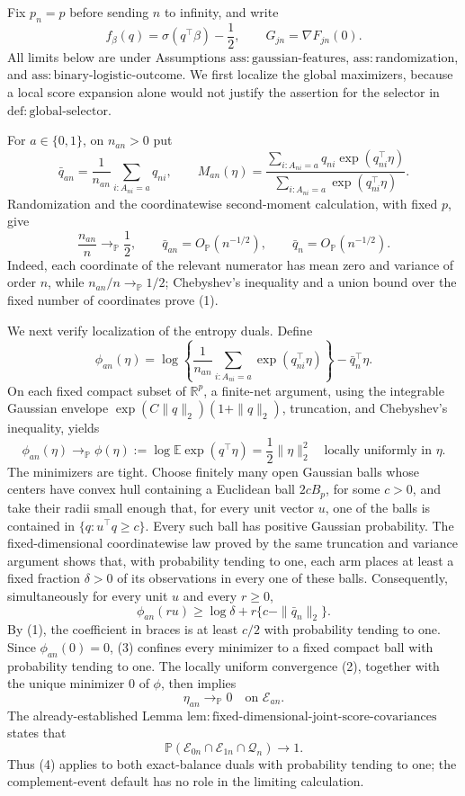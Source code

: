Fix \(p_n=p\) before sending \(n\) to infinity, and write
\[
 f_\beta(q)=\sigma(q^\top\beta)-\frac12,
 \qquad
 G_{jn}=\nabla F_{jn}(0).
\]
All limits below are under Assumptions
\(\mathrm{ass{:}gaussian\mbox{-}features}\),
\(\mathrm{ass{:}randomization}\), and
\(\mathrm{ass{:}binary\mbox{-}logistic\mbox{-}outcome}\).  We first
localize the global maximizers, because a local score expansion alone would
not justify the assertion for the selector in
\(\mathrm{def{:}global\mbox{-}selector}\).

For \(a\in\{0,1\}\), on \(n_{an}>0\) put
\[
 \bar q_{an}=\frac1{n_{an}}\sum_{i:A_{ni}=a}q_{ni},
 \qquad
 M_{an}(\eta)=
 \frac{\sum_{i:A_{ni}=a}q_{ni}\exp(q_{ni}^{\top}\eta)}
      {\sum_{i:A_{ni}=a}\exp(q_{ni}^{\top}\eta)} .
\]
Randomization and the coordinatewise second-moment calculation, with fixed
\(p\), give
\[
 \frac{n_{an}}n\longrightarrow_{\mathbb P}\frac12,
 \qquad
 \bar q_{an}=O_{\mathbb P}(n^{-1/2}),
 \qquad
 \bar q_n=O_{\mathbb P}(n^{-1/2}).
 \tag{1}
\]
Indeed, each coordinate of the relevant numerator has mean zero and variance
of order \(n\), while \(n_{an}/n\to_{\mathbb P}1/2\); Chebyshev's inequality
and a union bound over the fixed number of coordinates prove (1).

We next verify localization of the entropy duals.  Define
\[
 \phi_{an}(\eta)=
 \log\!\left\{\frac1{n_{an}}\sum_{i:A_{ni}=a}
        \exp(q_{ni}^{\top}\eta)\right\}-\bar q_n^\top\eta .
\]
On each fixed compact subset of \(\mathbb R^p\), a finite-net argument,
using the integrable Gaussian envelope
\(\exp(C\|q\|_2)(1+\|q\|_2)\), truncation, and Chebyshev's inequality,
yields
\[
 \phi_{an}(\eta)\longrightarrow_{\mathbb P}
 \phi(\eta):=\log\mathbb E\exp(q^\top\eta)
 =\frac12\|\eta\|_2^2
 \quad\text{locally uniformly in }\eta .
 \tag{2}
\]
The minimizers are tight.  Choose finitely many open Gaussian balls whose
centers have convex hull containing a Euclidean ball \(2cB_p\), for some
\(c>0\), and take their radii small enough that, for every unit vector
\(u\), one of the balls is contained in \(\{q:u^\top q\ge c\}\).  Every
such ball has positive Gaussian probability.  The fixed-dimensional
coordinatewise law proved by the same truncation and variance argument shows
that, with probability tending to one, each arm places at least a fixed
fraction \(\delta>0\) of its observations in every one of these balls.
Consequently, simultaneously for every unit \(u\) and every \(r\ge0\),
\[
 \phi_{an}(ru)
 \ge \log\delta+r\{c-\|\bar q_n\|_2\}.
 \tag{3}
\]
By (1), the coefficient in braces is at least \(c/2\) with probability
tending to one.  Since \(\phi_{an}(0)=0\), (3) confines every minimizer to a
fixed compact ball with probability tending to one.  The locally uniform
convergence (2), together with the unique minimizer \(0\) of \(\phi\), then
implies
\[
 \eta_{an}\longrightarrow_{\mathbb P}0
 \quad\text{on }\mathcal E_{an}.
 \tag{4}
\]
The already-established Lemma
\(\mathrm{lem{:}fixed\mbox{-}dimensional\mbox{-}joint\mbox{-}score\mbox{-}covariances}\)
states that
\[
 \mathbb P(\mathcal E_{0n}\cap\mathcal E_{1n}\cap\mathcal Q_n)
 \longrightarrow1.
 \tag{5}
\]
Thus (4) applies to both exact-balance duals with probability tending to one;
the complement-event default has no role in the limiting calculation.

